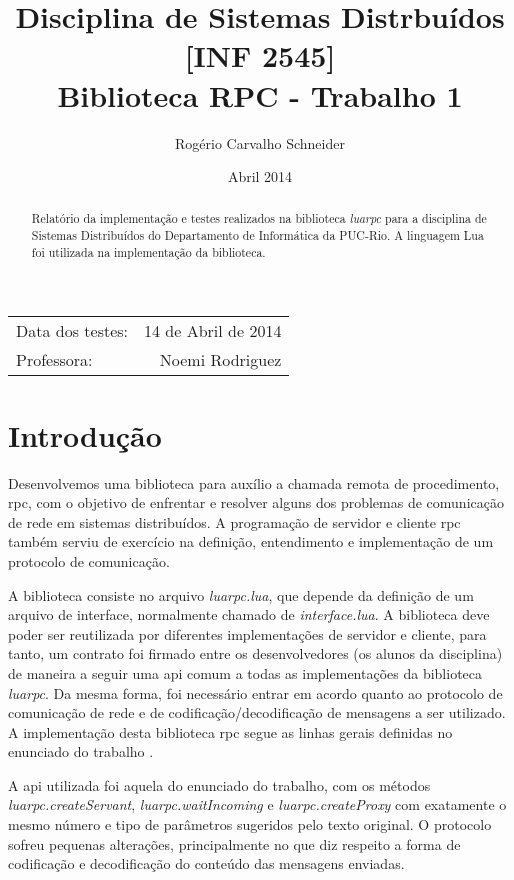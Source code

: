 \documentclass[11pt]{article}
\begin{document}
\title{Disciplina de Sistemas Distrbuídos [INF 2545] \\ Biblioteca RPC -
Trabalho 1}
\author{Rogério Carvalho Schneider}
\date{Abril 2014}
\maketitle

\begin{center}
\begin{tabular}{l r}
Data dos testes: & 14 de Abril de 2014 \\
Professora: & Noemi Rodriguez
\end{tabular}
\end{center}

\begin{abstract}
Relatório da implementação e testes realizados na biblioteca \textit{luarpc}
para a disciplina de Sistemas Distribuídos do Departamento de Informática da PUC-Rio.
A linguagem Lua foi utilizada na implementação da biblioteca.
\end{abstract}

\doublespacing

\section{Introdução}\label{sec:introduction}

Desenvolvemos uma biblioteca para auxílio a chamada remota de
procedimento, \gls{rpc}, com o objetivo de enfrentar e resolver alguns dos problemas
de comunicação de rede em sistemas distribuídos. A programação de servidor e
cliente \gls{rpc} também serviu de exercício na definição, entendimento e
implementação de um protocolo de comunicação.

A biblioteca consiste no arquivo \textit{luarpc.lua}, que depende da
definição de um arquivo de interface, normalmente chamado de
\textit{interface.lua}. A biblioteca deve poder ser reutilizada por diferentes
implementações de servidor e cliente, para tanto, um contrato foi firmado entre
os desenvolvedores (os alunos da disciplina) de maneira a seguir uma \gls{api}
comum a todas as implementações da biblioteca \textit{luarpc}. Da mesma forma,
foi necessário entrar em acordo quanto ao protocolo de comunicação de rede e de
codificação/decodificação de mensagens a ser utilizado. A implementação desta
biblioteca \gls{rpc} segue as linhas gerais definidas no enunciado do trabalho
\cite{trab1}.

A \gls{api} utilizada foi aquela do enunciado do trabalho, com os métodos
\textit{luarpc.createServant}, \textit{luarpc.waitIncoming} e
\textit{luarpc.createProxy} com exatamente o mesmo número e tipo de parâmetros
sugeridos pelo texto original. O protocolo sofreu pequenas alterações,
principalmente no que diz respeito a forma de codificação e decodificação do
conteúdo das mensagens enviadas.
\end{document}
